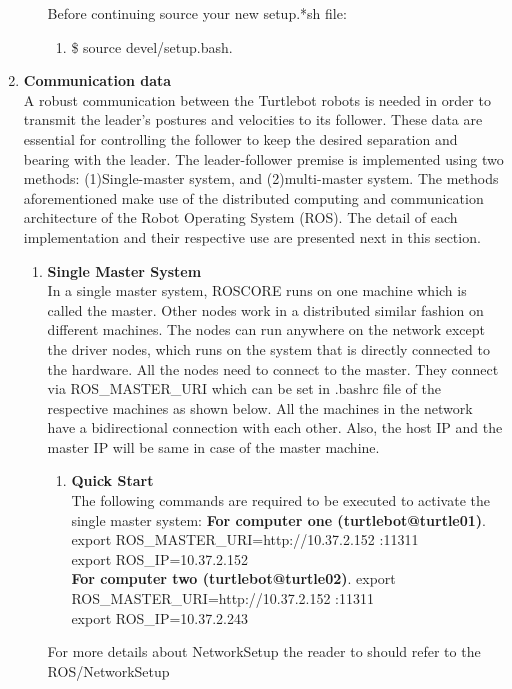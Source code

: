 \documentclass[journal]{IEEEtran}
\begin{document}
\begin{enumerate}
\begin{enumerate}
Before continuing source your new setup.*sh file:
\begin{enumerate}
\item {{\$} source devel/setup.bash}.
\end{enumerate}

\end{enumerate}








\item \textbf {Communication data}\\
A robust communication between the Turtlebot robots is needed in order to transmit the leader’s postures and velocities to its follower. These data are essential for controlling the follower to keep the desired separation and bearing with the leader. The leader-follower premise is implemented using two methods: (1)Single-master system, and (2)multi-master system. The methods aforementioned make use of the distributed computing and communication architecture of the Robot Operating System (ROS). The detail of each implementation and their respective use are presented next in this section. 

\begin{enumerate} 
\item \textbf {Single Master System}\\

In a single master system, ROSCORE runs on one machine
which is called the master. Other nodes work in a distributed similar fashion on different machines. The nodes can run anywhere on the network except the driver nodes, which runs on the system that is directly connected to the hardware. All the nodes need to connect to the master. They connect via ROS{\_}MASTER{\_}URI which can be set in .bashrc file of the respective machines as shown below. All the machines in the network have a bidirectional connection with each other. Also, the host IP and the master IP will be same in case of the master machine.


\begin{enumerate}
\item \textbf {Quick Start}\\
The following commands are required to be executed to activate the single master system:
\textbf{For computer one (turtlebot@turtle01)}.
export ROS{\_}MASTER{\_}URI=http://10.37.2.152 :11311\\
export ROS{\_}IP=10.37.2.152\\
\textbf{For computer two (turtlebot@turtle02)}.
export ROS{\_}MASTER{\_}URI=http://10.37.2.152 :11311\\
export ROS{\_}IP=10.37.2.243
\end{enumerate}
For more details about NetworkSetup the reader to should refer to the ROS/NetworkSetup \cite{temp11}



\end{enumerate}
\end{enumerate}
\end{document}
